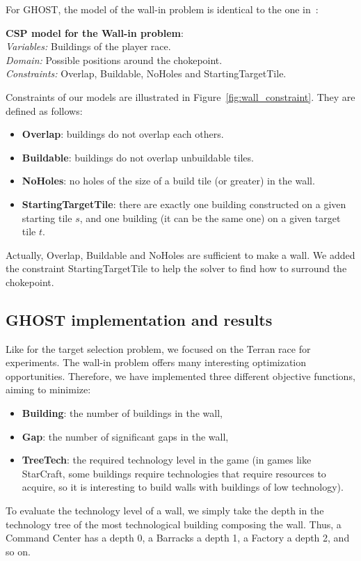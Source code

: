 \documentclass[journal]{IEEEtran}
\newcommand{\ghost}{\textsc{GHOST}\xspace}
\newcommand{\modelcsp}[4]%
{ \begin{trivlist}
  \item[]%
    \textbf{CSP model for #1}:\\
    \textit{Variables:} #2\\
    \textit{Domain:} #3\\
    \textit{Constraints:} #4
  \end{trivlist}%
}
\begin{document}
For \ghost, the  model of the wall-in problem is  identical to the one
in~\cite{RichouxUO14}:
\modelcsp{the Wall-in problem}%
{Buildings of the player race.}%
{Possible positions around the chokepoint.}%
{Overlap, Buildable, NoHoles and StartingTargetTile.}

Constraints     of      our     models     are      illustrated     in
Figure~\ref{fig:wall_constraint}. They are defined as follows:
\begin{itemize}
\item {\bf Overlap}: buildings do not overlap each others.
\item {\bf Buildable}: buildings do not overlap unbuildable tiles.
\item {\bf NoHoles}: no holes of the size of a build tile (or greater)
  in the wall.
\item  {\bf  StartingTargetTile}:  there   are  exactly  one  building
  constructed on a  given starting tile $s$, and one  building (it can
  be the same one) on a given target tile $t$.
\end{itemize}

Actually,  Overlap, Buildable  and NoHoles  are sufficient  to make  a
wall. We added the constraint StartingTargetTile to help the solver to
find how to surround the chokepoint.

\subsection{\ghost implementation and results}

Like for the  target selection problem, we focused on  the Terran race
for  experiments.    The  wall-in  problem  offers   many  interesting
optimization  opportunities.   Therefore,  we have  implemented  three
different objective functions, aiming to minimize:
\begin{itemize}
\item {\bf Building}: the number of buildings in the wall,
\item {\bf Gap}: the number of significant gaps in the wall,
\item {\bf  TreeTech}: the required  technology level in the  game (in
  games  like  StarCraft,  some buildings  require  technologies  that
  require resources  to acquire, so  it is interesting to  build walls
  with buildings of low technology).
\end{itemize}

To evaluate the  technology level of a wall, we  simply take the depth
in the  technology tree of  the most technological  building composing
the wall. Thus, a Command Center has  a depth 0, a Barracks a depth 1,
a Factory a depth 2, and so on.
\end{document}
